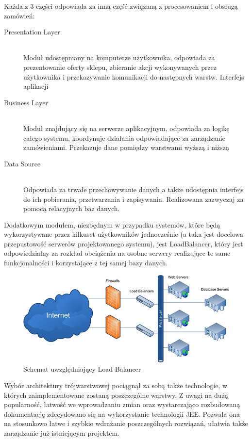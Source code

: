 Każda z 3 części odpowiada za inną część związaną z procesowaniem i obsługą
zamówień:
\begin{description}
	\item[Presentation Layer] \hfill \\
		Moduł udostępniany na komputerze użytkownika, odpowiada za prezentowanie
		oferty sklepu, zbieranie akcji wykonywanych przez użytkownika i przekazywanie
		komunikacji do następnych warstw. Interfejs aplikacji
	\item[Business Layer] \hfill \\
		Moduł znajdujący się na serwerze aplikacyjnym, odpowiada za logikę całego
		systemu, koordynuje działania odpowiadające za zarządzanie zamówieniami.
		Przekazuje dane pomiędzy warstwami wyższą i niższą
	\item[Data Source] \hfill \\
		Odpowiada za trwałe przechowywanie danych a także udostępnia interfejs do ich
		pobierania, przetwarzania i zapisywania. Realizowana zazwyczaj za pomocą
		relacyjnych baz danych.
\end{description}

Dodatkowym modułem, niezbędnym w przypadku systemów, które będą wykorzystywane
przez kilkuset użytkowników jednocześnie (a taka jest docelowa przepustowość
serwerów projektowanego systemu), jest LoadBalancer, który jest odpowiedzialny
za rozkład obciążenia na osobne serwery realizujące te same funkcjonalności i
korzystające z tej samej bazy danych.

\begin{figure}[h!]
    \includegraphics[width=\textwidth,
    height=0.5\textheight]{graphics/LoadBalancer.png}
  \caption{Schemat uwzględniający Load Balancer}
\end{figure}
Wybór architektury trójwarstwowej pociągnął za sobą także technologie, w których
zaimplementowane zostaną poszczególne warstwy. Z uwagi na dużą popularność, łatwość we wprowadzaniu zmian oraz wystarczająco rozbudowaną dokumentację zdecydowano się na wykorzystanie technologii JEE. Pozwala ona na stosunkowo łatwe i szybkie wdrażanie poszczególnych rozwiązań, ułatwia także zarządzanie już istniejącym projektem.

